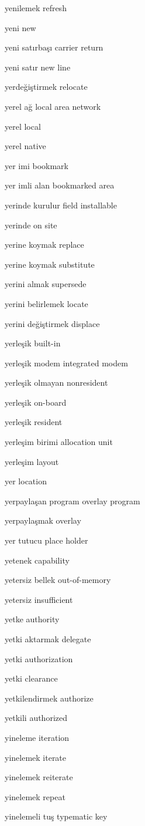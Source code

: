 \documentclass[12pt,fleqn]{article}\usepackage{../../common}
\begin{document}
yenilemek refresh

yeni new

yeni satırbaşı carrier return

yeni satır new line

yerdeğiştirmek relocate

yerel ağ local area network

yerel local

yerel native

yer imi bookmark

yer imli alan bookmarked area

yerinde kurulur field installable

yerinde on site

yerine koymak replace

yerine koymak substitute

yerini almak supersede

yerini belirlemek locate

yerini değiştirmek displace

yerleşik built-in

yerleşik modem integrated modem

yerleşik olmayan nonresident

yerleşik on-board

yerleşik resident

yerleşim birimi allocation unit

yerleşim layout

yer location

yerpaylaşan program overlay program

yerpaylaşmak overlay

yer tutucu place holder

yetenek capability

yetersiz bellek out-of-memory

yetersiz insufficient

yetke authority

yetki aktarmak delegate

yetki authorization

yetki clearance

yetkilendirmek authorize

yetkili authorized

yineleme iteration

yinelemek iterate

yinelemek reiterate

yinelemek repeat

yinelemeli tuş typematic key
\end{document}
